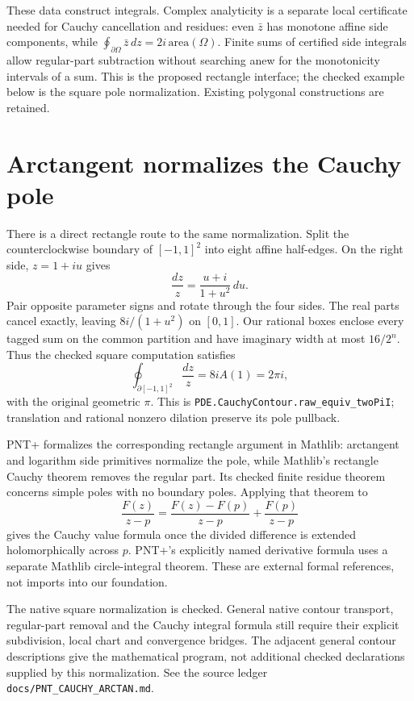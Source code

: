 These data construct integrals. Complex analyticity is a separate local
certificate needed for Cauchy cancellation and residues: even $\bar z$
has monotone affine side components, while
$\oint_{\partial\Omega}\bar z\,dz=2i\,\mathrm{area}(\Omega)$.
Finite sums of certified side integrals allow regular-part subtraction
without searching anew for the monotonicity intervals of a sum. This is
the proposed rectangle interface; the checked example below is the square
pole normalization. Existing polygonal constructions are retained.

\section{Arctangent normalizes the Cauchy pole}
\label{sec:cauchy-arctan}
There is a direct rectangle route to the same normalization. Split the
counterclockwise boundary of $[-1,1]^2$ into eight affine half-edges.
On the right side, $z=1+iu$ gives
\[
 \frac{dz}{z}=\frac{u+i}{1+u^2}\,du.
\]
Pair opposite parameter signs and rotate through the four sides. The real
parts cancel exactly, leaving $8i/(1+u^2)$ on $[0,1]$. Our rational boxes
enclose every tagged sum on the common partition and have imaginary width
at most $16/2^n$. Thus the checked square computation satisfies
\[
 \oint_{\partial[-1,1]^2}\frac{dz}{z}=8iA(1)=2\pi i,
\]
with the original geometric $\pi$. This is
\texttt{PDE.CauchyContour.raw\_equiv\_twoPiI}; translation and rational
nonzero dilation preserve its pole pullback.

PNT+ formalizes the corresponding rectangle argument in Mathlib:
arctangent and logarithm side primitives normalize the pole, while
Mathlib's rectangle Cauchy theorem removes the regular part. Its checked
finite residue theorem concerns simple poles with no boundary poles.
Applying that theorem to
\[
 \frac{F(z)}{z-p}=
 \frac{F(z)-F(p)}{z-p}+\frac{F(p)}{z-p}
\]
gives the Cauchy value formula once the divided difference is extended
holomorphically across $p$. PNT+'s explicitly named derivative formula
uses a separate Mathlib circle-integral theorem. These are external
formal references, not imports into our foundation.

The native square normalization is checked. General native contour
transport, regular-part removal and the Cauchy integral formula still
require their explicit subdivision, local chart and convergence bridges.
The adjacent general contour descriptions give the mathematical program,
not additional checked declarations supplied by this normalization.
See the source ledger \texttt{docs/PNT\_CAUCHY\_ARCTAN.md}.

